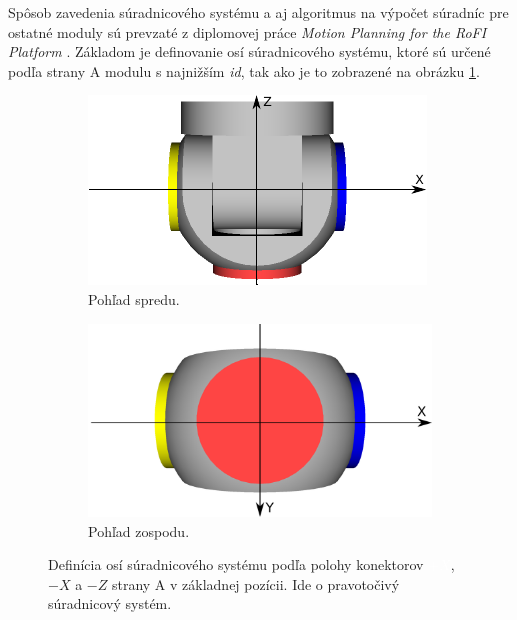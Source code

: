 \documentclass[
  printed, %
  oneside, %
  notable,   %
  nolof,     %
  nolot,     %
]{fithesis3}
\begin{document}
Spôsob zavedenia súradnicového systému a aj algoritmus na výpočet súradníc pre ostatné moduly sú prevzaté z diplomovej práce \textit{Motion Planning for the RoFI Platform} \cite{vozarovaMasterThesis}. Základom je definovanie osí súradnicového systému, ktoré sú určené podľa strany A modulu s najnižším \textit{id}, tak ako je to zobrazené na obrázku \ref{fig:moduleAxis}. 

\begin{figure}[hbt!]
    \centering
    \begin{subfigure}[b]{0.47\textwidth}
        \includegraphics[width=\textwidth]{pictures/module_dock_identification.pdf}
        \caption[Pohľad spredu]{Pohľad spredu.}
    \end{subfigure}
    \begin{subfigure}[b]{0.47\textwidth}
        \includegraphics[width=\textwidth]{pictures/module_dock_identification_bottom.pdf}
        \caption[Pohľad zospodu]{Pohľad zospodu.}
    \end{subfigure}
    \caption[Definícia osí súradnicového systému]{Definícia osí súradnicového systému podľa polohy konektorov \textcolor{white}{\colorbox{modra}{$+X$}}, \colorbox{zlta}{$-X$} a \colorbox{cervena}{$-Z$} strany A v základnej pozícii. Ide o pravotočivý súradnicový systém. }
    \label{fig:moduleAxis}
\end{figure}
\end{document}
